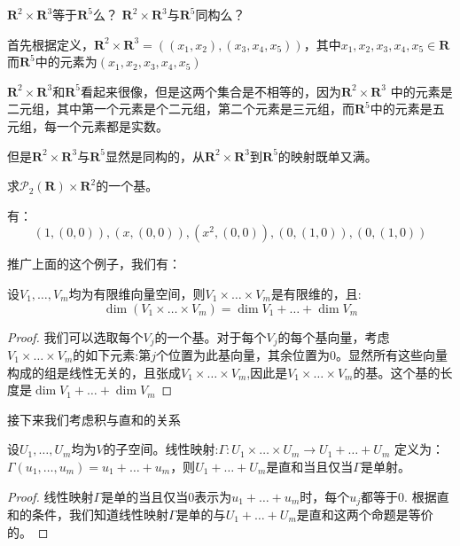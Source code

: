 \documentclass[10pt,a4paper,UTF8]{article}
\begin{document}
\begin{instance}
\(\mathbf{R}^{2}\times \mathbf{R}^{3}\)等于\(\mathbf{R}^{5}\)么？ \(\mathbf{R}^{2}\times \mathbf{R}^{3}\)与\(\mathbf{R}^{5}\)同构么？

首先根据定义，\(\mathbf{R}^{2}\times \mathbf{R}^{3} = ((x_1,x_2),(x_3,x_4,x_5))\)，其中\(x_{1},x_{2},x_{3},x_{4},x_{5}\in \mathbf{R}\) 而\(\mathbf{R}^{5}\)中的元素为\((x_{1},x_{2},x_{3},x_{4},x_{5})\)

\(\mathbf{R}^{2}\times \mathbf{R}^{3}\)和\(\mathbf{R}^{5}\)看起来很像，但是这两个集合是不相等的，因为\(\mathbf{R}^{2}\times \mathbf{R}^{3}\) 中的元素是二元组，其中第一个元素是个二元组，第二个元素是三元组，而\(\mathbf{R}^{5}\)中的元素是五元组，每一个元素都是实数。

但是\(\mathbf{R}^{2}\times \mathbf{R}^{3}\)与\(\mathbf{R}^{5}\)显然是同构的，从\(\mathbf{R}^{2}\times \mathbf{R}^{3}\)到\(\mathbf{R}^{5}\)的映射既单又满。
\end{instance}

\begin{instance}
求\(\mathcal{P}_{2}{ (\mathbf{R})}\times \mathbf{R}^{2}\)的一个基。

有：
\[(1,(0,0)),(x,(0,0)),(x^{2},(0,0)),(0,(1,0)),(0,(1,0))\]
\end{instance}
推广上面的这个例子，我们有：
\begin{theorem}
设\(V_{1},\ldots ,V_{m}\)均为有限维向量空间，则\(V_{1}\times \ldots \times V_{m}\)是有限维的，且:
\[\dim(V_{1}\times \ldots \times V_{m}) = \dim V_{1} + \ldots + \dim V_{m}\]
\end{theorem}
\begin{proof}
我们可以选取每个\(V_{j}\)的一个基。对于每个\(V_{j}\)的每个基向量，考虑\(V_{1}\times \ldots \times V_{m}\)的如下元素:第\(j\)个位置为此基向量，其余位置为\(0\)。显然所有这些向量构成的组是线性无关的，且张成\(V_{1}\times \ldots \times V_{m}\),因此是\(V_{1}\times \ldots \times V_{m}\)的基。这个基的长度是\(\dim V_{1} + \ldots + \dim V_{m}\)
\end{proof}

接下来我们考虑积与直和的关系
\begin{theorem}
设\(U_{1},\ldots ,U_{m}\)均为\(V\)的子空间。线性映射:\(\Gamma: U_{1}\times \ldots \times U_{m}\rightarrow U_{1} + \ldots +U_{m}\) 定义为：\(\Gamma(u_{1},\ldots ,u_{m}) = u_{1} + \ldots + u_{m}\)，则\(U_{1} + \ldots + U_{m}\)是直和当且仅当\(\Gamma\)是单射。
\end{theorem}

\begin{proof}
线性映射\(\Gamma\)是单的当且仅当\(0\)表示为\(u_{1} + \ldots + u_{m}\)时，每个\(u_{j}\)都等于\(0\). 根据直和的条件，我们知道线性映射\(\Gamma\)是单的与\(U_{1}+ \ldots + U_{m}\)是直和这两个命题是等价的。
\end{proof}
\end{document}
